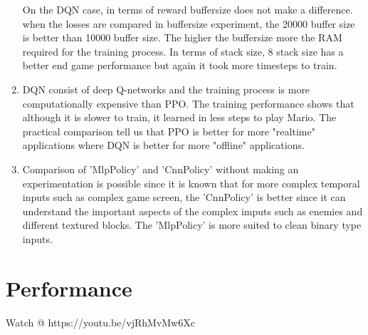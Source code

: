 \documentclass[3p,times,procedia]{elsarticle}
\begin{document}
\begin{enumerate}
    On the DQN case, in terms of reward buffersize does not make a difference.
    when the losses are compared in buffersize experiment, the 20000 buffer size is better than 10000 buffer size. The higher the buffersize more the RAM required for the training process.
    In terms of stack size, 8 stack size has a better end game performance but again it took more timesteps to train.
    \\
    \item DQN consist of deep Q-networks and the training process is more computationally expensive than PPO. The training performance shows that although it is slower to train, it learned in less steps to play Mario. The practical comparison tell us that PPO is better for more "realtime" applications where DQN is better for more "offline" applications.
    \\
    \item Comparison of 'MlpPolicy' and 'CnnPolicy' without making an experimentation is possible since it is known that for more complex temporal inputs such as complex game screen, the 'CnnPolicy' is better since it can understand the important aspects of the complex imputs such as enemies and different textured blocks. The 'MlpPolicy' is more suited to clean binary type inputs.
\end{enumerate}


\section{\textbf{Performance}}
Watch @ https://youtu.be/vjRhMvMw6Xc




\end{document}
